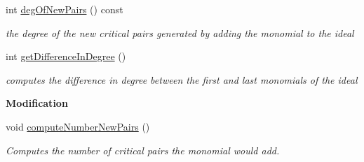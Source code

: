 \begin{Indent}
\begin{DoxyCompactItemize}
int \hyperlink{group___g_b_computation_aa672d26c042569006512f3ac0fe1de34}{deg\+Of\+New\+Pairs} () const
\begin{DoxyCompactList}\small\item\em the degree of the new critical pairs generated by adding the monomial to the ideal \end{DoxyCompactList}\item 
\mbox{\label{group___g_b_computation_a7dd8fea0916e829944f63107a288ed58}} 
int \hyperlink{group___g_b_computation_a7dd8fea0916e829944f63107a288ed58}{get\+Difference\+In\+Degree} ()
\begin{DoxyCompactList}\small\item\em computes the difference in degree between the first and last monomials of the ideal \end{DoxyCompactList}\end{DoxyCompactItemize}
\end{Indent}
\begin{Indent}\textbf{ Modification}\par
\begin{DoxyCompactItemize}
\item 
\mbox{\label{group___g_b_computation_ad3df0f54a6de6a86d0c61d8a14cbaed1}} 
void \hyperlink{group___g_b_computation_ad3df0f54a6de6a86d0c61d8a14cbaed1}{compute\+Number\+New\+Pairs} ()
\begin{DoxyCompactList}\small\item\em Computes the number of critical pairs the monomial would add. \end{DoxyCompactList}\end{DoxyCompactItemize}
\end{Indent}
